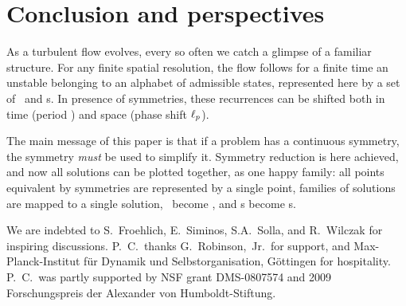
\section{Conclusion and perspectives}
\label{s:concl}


As a turbulent flow evolves, every so often we catch a glimpse of a
familiar structure. For any finite spatial resolution, the flow
follows for a finite time an unstable {\cohStr} belonging to an
alphabet of admissible states, represented here by a set of \reqva\
and \rpo s.
In presence of symmetries, these recurrences can be shifted both in time
(period \period{p}) and space (phase shift $\ell_p$).

The main message of this paper is that if a problem has a continuous
symmetry, the symmetry \emph{must} be used to simplify it.
Symmetry reduction
is here achieved, and now all solutions can be plotted
together, as one happy family: all points equivalent by symmetries are
represented by a single point, families of solutions are mapped to a
single solution, \reqva\ become \eqva, and \rpo s become \po s.

\begin{acknowledgments}
We are indebted to
S.~Froehlich,
E.~Siminos,
S.A.~Solla,
and
R.~Wilczak
for inspiring discussions.
P.~C.\ thanks G.~Robinson,~Jr.\ for support, and
Max-Planck-Institut f\"ur Dynamik und Selbstorganisation,
G\"ottingen for hospitality.
P.~C.\ was partly supported by NSF grant DMS-0807574
and
2009 Forschungspreis der Alexander von Humboldt-Stiftung.
\end{acknowledgments}
